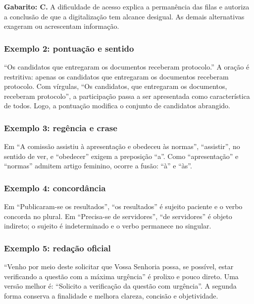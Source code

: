 \documentclass[11pt,a4paper]{article}
\begin{document}
\begin{alerta}
\textbf{Gabarito: C.} A dificuldade de acesso explica a permanência das filas e autoriza a conclusão de que a digitalização tem alcance desigual. As demais alternativas exageram ou acrescentam informação.
\end{alerta}

\subsubsection*{Exemplo 2: pontuação e sentido}

“Os candidatos que entregaram os documentos receberam protocolo.” A oração é restritiva: apenas os candidatos que entregaram os documentos receberam protocolo. Com vírgulas, “Os candidatos, que entregaram os documentos, receberam protocolo”, a participação passa a ser apresentada como característica de todos. Logo, a pontuação modifica o conjunto de candidatos abrangido.

\subsubsection*{Exemplo 3: regência e crase}

Em “A comissão assistiu à apresentação e obedeceu às normas”, “assistir”, no sentido de ver, e “obedecer” exigem a preposição “a”. Como “apresentação” e “normas” admitem artigo feminino, ocorre a fusão: “à” e “às”.

\subsubsection*{Exemplo 4: concordância}

Em “Publicaram-se os resultados”, “os resultados” é sujeito paciente e o verbo concorda no plural. Em “Precisa-se de servidores”, “de servidores” é objeto indireto; o sujeito é indeterminado e o verbo permanece no singular.

\subsubsection*{Exemplo 5: redação oficial}

“Venho por meio deste solicitar que Vossa Senhoria possa, se possível, estar verificando a questão com a máxima urgência” é prolixo e pouco direto. Uma versão melhor é: “Solicito a verificação da questão com urgência”. A segunda forma conserva a finalidade e melhora clareza, concisão e objetividade.
\end{document}
